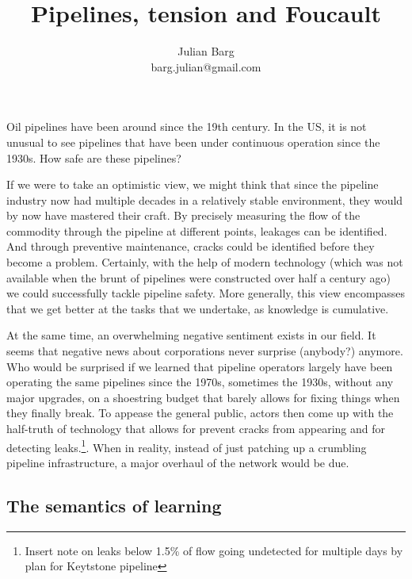 \documentclass[12pt, man, natbib]{apa6}
\title{Pipelines, tension and Foucault}
\author{Julian Barg\\barg.julian@gmail.com}
\affiliation{Ivey Business School}
\begin{document}
	
	\maketitle
	
	\singlespacing
	
	\section{}	

	Oil pipelines have been around since the 19th century. In the US, it is not unusual to see pipelines that have been under continuous operation since the 1930s. How safe are these pipelines? 
	
	If we were to take an optimistic view, we might think that since the pipeline industry now had multiple decades in a relatively stable environment, they would by now have mastered their craft. By precisely measuring the flow of the commodity through the pipeline at different points, leakages can be identified. And through preventive maintenance, cracks could be identified before they become a problem. Certainly, with the help of modern technology (which was not available when the brunt of pipelines were constructed over half a century ago) we could successfully tackle pipeline safety. More generally, this view encompasses that we get better at the tasks that we undertake, as knowledge is cumulative.
	
	At the same time, an overwhelming negative sentiment exists in our field. It seems that negative news about corporations never surprise (anybody?) anymore. Who would be surprised if we learned that pipeline operators largely have been operating the same pipelines since the 1970s, sometimes the 1930s, without any major upgrades, on a shoestring budget that barely allows for fixing things when they finally break. To appease the general public, actors then come up with the half-truth of technology that allows for prevent cracks from appearing and for detecting leaks.\footnote{Insert note on leaks below 1.5\% of flow going undetected for multiple days by plan for Keytstone pipeline}. When in reality, instead of just patching up a crumbling pipeline infrastructure, a major overhaul of the network would be due.
	
	\subsection{The semantics of learning}
	
\end{document}
